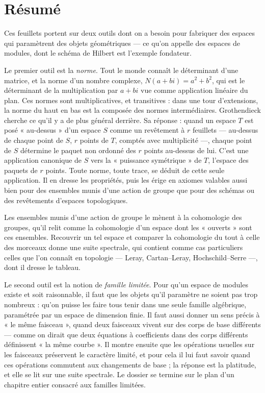 \documentclass[11pt,a4paper]{article}
\begin{document}
\section*{Résumé}

\begin{resume}
Ces feuillets portent sur deux outils dont on a besoin pour fabriquer des
espaces qui paramètrent des objets géométriques --- ce qu'on appelle des
espaces de modules, dont le schéma de Hilbert est l'exemple fondateur.

Le premier outil est la \emph{norme}. Tout le monde connaît le déterminant
d'une matrice, et la norme d'un nombre complexe, $N(a+bi) = a^{2}+b^{2}$,
qui est le déterminant de la multiplication par $a+bi$ vue comme application
linéaire du plan. Ces normes sont multiplicatives, et transitives : dans une
tour d'extensions, la norme du haut en bas est la composée des normes
intermédiaires. Grothendieck cherche ce qu'il y a de plus général derrière.
Sa réponse : quand un espace $T$ est posé « au-dessus » d'un espace $S$
comme un revêtement à $r$ feuillets --- au-dessus de chaque point de $S$,
$r$ points de $T$, comptés avec multiplicité ---, chaque point de $S$
détermine le paquet non ordonné des $r$ points au-dessus de lui. C'est une
application canonique de $S$ vers la « puissance symétrique » de $T$, l'espace
des paquets de $r$ points. Toute norme, toute trace, se déduit de cette seule
application. Il en dresse les propriétés, puis les érige en axiomes valables
aussi bien pour des ensembles munis d'une action de groupe que pour des
schémas ou des revêtements d'espaces topologiques.

Les ensembles munis d'une action de groupe le mènent à la cohomologie des
groupes, qu'il relit comme la cohomologie d'un espace dont les « ouverts »
sont ces ensembles. Recouvrir un tel espace et comparer la cohomologie du
tout à celle des morceaux donne une suite spectrale, qui contient comme cas
particuliers celles que l'on connaît en topologie --- Leray, Cartan--Leray,
Hochschild--Serre ---, dont il dresse le tableau.

Le second outil est la notion de \emph{famille limitée}. Pour qu'un espace
de modules existe et soit raisonnable, il faut que les objets qu'il
paramètre ne soient pas trop nombreux : qu'on puisse les faire tous tenir
dans une seule famille algébrique, paramétrée par un espace de dimension
finie. Il faut aussi donner un sens précis à « le même faisceau », quand deux
faisceaux vivent sur des corps de base différents --- comme on dirait que
deux équations à coefficients dans des corps différents définissent « la même
courbe ». Il montre ensuite que les opérations usuelles sur les faisceaux
préservent le caractère limité, et pour cela il lui faut savoir quand ces
opérations commutent aux changements de base ; la réponse est la platitude,
et elle se lit sur une suite spectrale. Le dossier se termine sur le plan
d'un chapitre entier consacré aux familles limitées.


\end{resume}
\end{document}
